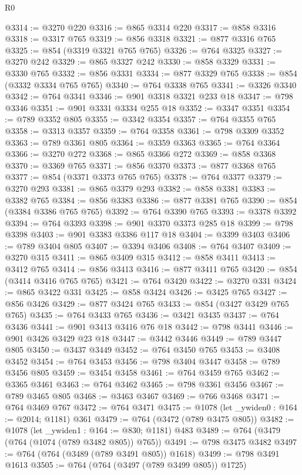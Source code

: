 \begin{lexlean}{R0}
\begin{coremodule}
{{{{{@3314 := @3270 @220
@3316 := @865 @3314 @220
@3317 := @858 @3316
@3318 := @3317 @765
@3319 := @856 @3318
@3321 := @877 @3316 @765
@3325 := @854 (@3319 @3321 @765 @765)
@3326 := @764 @3325
@3327 := @3270 @242
@3329 := @865 @3327 @242
@3330 := @858 @3329
@3331 := @3330 @765
@3332 := @856 @3331
@3334 := @877 @3329 @765
@3338 := @854 (@3332 @3334 @765 @765)
@3340 := @764 @3338 @765
@3341 := @3326 @3340
@3342 := @764 @3341
@3346 := @901 @3318 @3321 @233 @18
@3347 := @798 @3346
@3351 := @901 @3331 @3334 @255 @18
@3352 := @3347 @3351
@3354 := @789 @3352 @805
@3355 := @3342 @3354
@3357 := @764 @3355 @765
@3358 := @3313 @3357
@3359 := @764 @3358
@3361 := @798 @3309 @3352
@3363 := @789 @3361 @805
@3364 := @3359 @3363
@3365 := @764 @3364
@3366 := @3270 @272
@3368 := @865 @3366 @272
@3369 := @858 @3368
@3370 := @3369 @765
@3371 := @856 @3370
@3373 := @877 @3368 @765
@3377 := @854 (@3371 @3373 @765 @765)
@3378 := @764 @3377
@3379 := @3270 @293
@3381 := @865 @3379 @293
@3382 := @858 @3381
@3383 := @3382 @765
@3384 := @856 @3383
@3386 := @877 @3381 @765
@3390 := @854 (@3384 @3386 @765 @765)
@3392 := @764 @3390 @765
@3393 := @3378 @3392
@3394 := @764 @3393
@3398 := @901 @3370 @3373 @285 @18
@3399 := @798 @3398
@3403 := @901 @3383 @3386 @117 @18
@3404 := @3399 @3403
@3406 := @789 @3404 @805
@3407 := @3394 @3406
@3408 := @764 @3407
@3409 := @3270 @315
@3411 := @865 @3409 @315
@3412 := @858 @3411
@3413 := @3412 @765
@3414 := @856 @3413
@3416 := @877 @3411 @765
@3420 := @854 (@3414 @3416 @765 @765)
@3421 := @764 @3420
@3422 := @3270 @331
@3424 := @865 @3422 @331
@3425 := @858 @3424
@3426 := @3425 @765
@3427 := @856 @3426
@3429 := @877 @3424 @765
@3433 := @854 (@3427 @3429 @765 @765)
@3435 := @764 @3433 @765
@3436 := @3421 @3435
@3437 := @764 @3436
@3441 := @901 @3413 @3416 @76 @18
@3442 := @798 @3441
@3446 := @901 @3426 @3429 @23 @18
@3447 := @3442 @3446
@3449 := @789 @3447 @805
@3450 := @3437 @3449
@3452 := @764 @3450 @765
@3453 := @3408 @3452
@3454 := @764 @3453
@3456 := @798 @3404 @3447
@3458 := @789 @3456 @805
@3459 := @3454 @3458
@3461 := @764 @3459 @765
@3462 := @3365 @3461
@3463 := @764 @3462
@3465 := @798 @3361 @3456
@3467 := @789 @3465 @805
@3468 := @3463 @3467
@3469 := @766 @3468
@3471 := @764 @3469 @767
@3472 := @764 @3471
@3475 := @1078 (let _ywiden0 : @164 := @2014; @1181) @361
@3479 := @764 (@3472 (@789 @3475 @805))
@3482 := @1078 (let _ywiden1 : @164 := @830; @1181) @483
@3489 := @764 (@3479 (@764 (@1074 (@789 @3482 @805)) @765))
@3491 := @798 @3475 @3482
@3497 := @764 (@764 (@3489 (@789 @3491 @805)) @1618)
@3499 := @798 @3491 @1613
@3505 := @764 (@764 (@3497 (@789 @3499 @805)) @1725)
}}}}}
\end{coremodule}
\end{lexlean}

